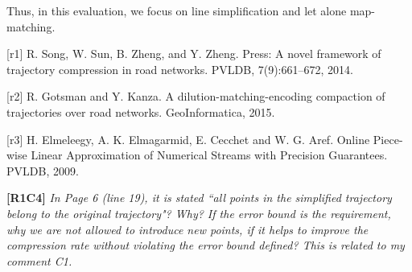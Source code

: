 \documentclass{letter}
\begin{document}

Thus, in this evaluation, we focus on line simplification and let alone map-matching. 


[r1] R. Song, W. Sun, B. Zheng, and Y. Zheng. Press: A novel framework of trajectory compression in road networks. PVLDB, 7(9):661--672, 2014.

[r2] R. Gotsman and Y. Kanza. A dilution-matching-encoding compaction of trajectories over road networks.
GeoInformatica, 2015.

[r3] H. Elmeleegy, A. K. Elmagarmid, E. Cecchet and W. G. Aref. Online Piece-wise Linear Approximation of Numerical Streams with Precision Guarantees. PVLDB, 2009.


\textbf{[R1C4]} \emph{ In Page 6 (line 19), it is stated ``all points in the simplified trajectory belong to the original trajectory"? Why? If the error bound is the requirement, why we are not allowed to introduce new points, if it helps to improve the compression rate without violating the error bound defined? This is related to my comment C1. }
\end{document}
